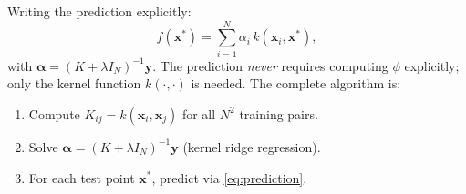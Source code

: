 \documentclass[12pt,a4paper]{article}
\newcommand{\bx}{\bm{x}}
\newcommand{\by}{\bm{y}}
\newcommand{\ba}{\bm{\alpha}}
\begin{document}
Writing the prediction explicitly:
\begin{equation}
  \boxed{
  f(\bx^*) = \sum_{i=1}^{N} \alpha_i\, k(\bx_i, \bx^*),
  }
  \label{eq:prediction}
\end{equation}
with $\ba = (K + \lambda I_N)^{-1}\by$.
The prediction \emph{never} requires computing $\phi$ explicitly; only the
kernel function $k(\cdot,\cdot)$ is needed.  The complete algorithm is:
\begin{enumerate}[leftmargin=*]
  \item Compute $K_{ij} = k(\bx_i, \bx_j)$ for all $N^2$ training pairs.
  \item Solve $\ba = (K + \lambda I_N)^{-1}\by$ (kernel ridge regression).
  \item For each test point $\bx^*$, predict via \eqref{eq:prediction}.
\end{enumerate}
\end{document}
